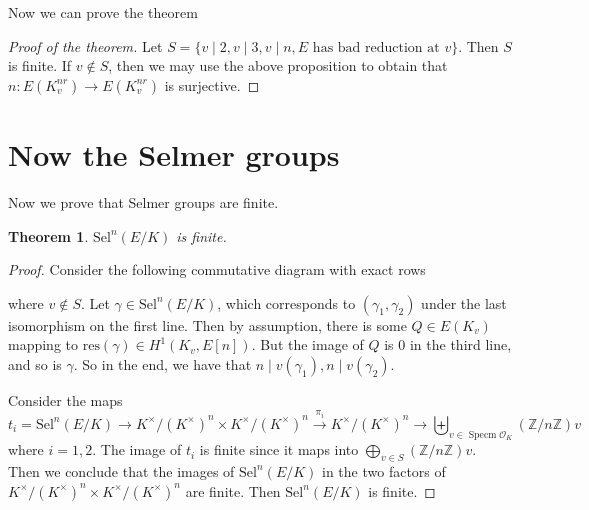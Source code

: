 \documentclass{article}
\newtheorem{thm}{Theorem}
\newcommand{\ord}{\mathcal{O}}
\newcommand{\kmkn}{K ^{\times} / (K ^{\times})^{n}}
\newcommand{\kvmkn}[1]{(#1) ^{\times} / ((#1) ^{\times})^{n}}
\DeclareMathOperator{\spec}{Specm}
\begin{document}
Now we can prove the theorem
\begin{proof}
[Proof of the theorem]
Let $ S = \{v\mid 2, v\mid 3, v\mid n, E \text{ has bad reduction at } v\} $.
Then $ S $ is finite.
If $ v\not\in S $, then we may use the above proposition to obtain that
$ n: E (K _{v}^{nr})\to E (K _{v}^{nr}) $ is surjective.
\end{proof}

\section{Now the Selmer groups}

Now we prove that Selmer groups are finite.

\begin{thm}
$ \mathrm{Sel}^{n}(E/K) $ is finite.
\end{thm}

\begin{proof}
Consider the following commutative diagram with exact rows
\begin{figure}[H]
\centering
{}

\end{figure}
where $ v\not\in S $.
Let $ \gamma\in \mathrm{Sel}^{n}(E/K) $, which corresponds to $ (\gamma _{1}, \gamma _{2}) $
under the last isomorphism on the first line.
Then by assumption, there is some $ Q\in E (K _{v}) $ mapping to 
$ \mathrm{res}(\gamma)\in H ^{1}(K _{v}, E [n]) $.
But the image of $ Q $ is $ 0 $ in the third line, and so is $ \gamma $.
So in the end, we have that $ n\mid v (\gamma _{1}), n\mid v (\gamma _{2}) $.

Consider the maps
$$ t _{i} = \mathrm{Sel}^{n}(E/K) \to \kmkn \times
\kmkn \xrightarrow{\pi _{i}} \kmkn \to \biguplus _{v\in \spec \ord _{K}} (\mathbb{Z}/n \mathbb{Z})v$$
where $ i=1,2 $.
The image of $ t _{i} $ is finite since it maps into $ \bigoplus _{v\in S}
(\mathbb{Z}/n \mathbb{Z})v$.
Then we conclude that
the images of $ \mathrm{Sel}^{n}(E/K) $ in the two factors of $\kmkn\times \kmkn $ are finite.
Then $ \mathrm{Sel}^{n}(E/K) $ is finite.
\end{proof}
\end{document}

